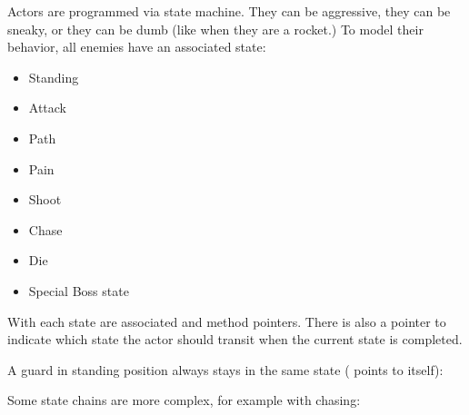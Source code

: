 Actors are programmed via state machine. They can be aggressive, they can be sneaky, or they can be dumb (like when they are a rocket.) To model their behavior, all enemies have an associated state:
\begin{itemize}
\item Standing
\item Attack
\item Path
\item Pain
\item Shoot
\item Chase
\item Die
\item Special Boss state
\end{itemize}

With each state are associated  and  method pointers. There is also a  pointer to indicate which state the actor should transit when the current state is completed.\\
\par
\begin{minipage}{\textwidth}

\end{minipage}
\par


A guard in standing position always stays in the same state ( points to itself):\\
\par

\begin{minipage}{\textwidth}

\end{minipage}
\par
Some state chains are more complex, for example with chasing:\\

\par
\begin{minipage}{\textwidth}

\end{minipage}
\par

